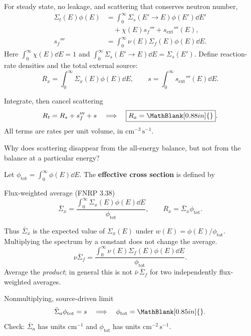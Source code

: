 \begin{handoutcolumns}
For steady state, no leakage, and scattering that conserves neutron number,
\begin{align*}
 \Sigma_t(E)\phi(E)
 &=\int_0^\infty\Sigma_s(E'\!\to E)\phi(E')\dd E'\\
 &\quad+\chi(E)s_f'''+s_{\mathrm{ext}}'''(E),\\
 s_f'''&=\int_0^\infty\nu(E)\Sigma_f(E)\phi(E)\dd E.
\end{align*}
Here $\int_0^\infty\chi(E)\dd E=1$ and
$\int_0^\infty\Sigma_s(E'\!\to E)\dd E=\Sigma_s(E')$.
Define reaction-rate densities and the total external source:
\[
 R_x=\int_0^\infty\Sigma_x(E)\phi(E)\dd E,
 \qquad s=\int_0^\infty s_{\mathrm{ext}}'''(E)\dd E.
\]
\begin{boardbox}{Integrate, then cancel scattering}
\[
 R_t=R_s+s_f'''+s
 \quad\Longrightarrow\quad
 \boxed{R_a=\MathBlank[0.88in]{}}.
\]
All terms are rates per unit volume, in $\mathrm{cm^{-3}\,s^{-1}}$.
\end{boardbox}
\begin{checkpoint}
Why does scattering disappear from the all-energy balance,
but not from the balance at a particular energy?
\end{checkpoint}

Let $\phi_{\mathrm{tot}}=\int_0^\infty\phi(E)\dd E$.
The \textbf{effective cross section} is defined by
\begin{fixedbox}{Flux-weighted average (FNRP 3.38)}
\[
 \boxed{\bar\Sigma_x=
 \frac{\int_0^\infty\Sigma_x(E)\phi(E)\dd E}
      {\phi_{\mathrm{tot}}}},
 \qquad R_x=\bar\Sigma_x\phi_{\mathrm{tot}}.
\]
\end{fixedbox}
Thus $\bar\Sigma_x$ is the expected value of $\Sigma_x(E)$
under $w(E)=\phi(E)/\phi_{\mathrm{tot}}$.
Multiplying the spectrum by a constant does not change the average.
\[
 \overline{\nu\Sigma_f}=
 \frac{\int_0^\infty\nu(E)\Sigma_f(E)\phi(E)\dd E}
      {\phi_{\mathrm{tot}}}.
\]
Average the \emph{product}; in general this is not
$\bar\nu\,\bar\Sigma_f$ for two independently flux-weighted averages.
\begin{boardbox}{Nonmultiplying, source-driven limit}
\[
 \bar\Sigma_a\phi_{\mathrm{tot}}=s
 \quad\Longrightarrow\quad
 \phi_{\mathrm{tot}}=\MathBlank[0.85in]{}.
\]
Check: $\bar\Sigma_a$ has units $\mathrm{cm^{-1}}$ and
$\phi_{\mathrm{tot}}$ has units $\mathrm{cm^{-2}\,s^{-1}}$.
\end{boardbox}


\end{handoutcolumns}
